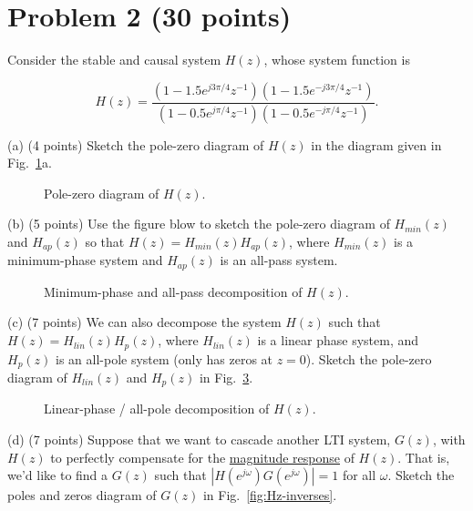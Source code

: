 \documentclass[10pt]{article}
\begin{document}
\section*{Problem 2 (30 points)}
Consider the stable and causal system $H(z)$, whose system function is

\begin{equation}
	H(z) = \frac{(1 - 1.5e^{j3\pi/4}z^{-1})(1 - 1.5e^{-j3\pi/4}z^{-1})}{(1 - 0.5e^{j\pi/4}z^{-1})(1 - 0.5e^{-j\pi/4}z^{-1})}.
\end{equation}

\begin{description}
\item{(a)} (4 points)
Sketch the pole-zero diagram of $H(z)$ in the diagram given in Fig.~\ref{fig:pole-zero-sketch}a.

\begin{figure}[!h]
\centering
	\resizebox{0.45\textwidth}{!}{}
    \caption{Pole-zero diagram of $H(z)$.} \label{fig:pole-zero-sketch}
\end{figure}

\item{(b)} (5 points) Use the figure blow to sketch the pole-zero diagram of $H_{min}(z)$ and $H_{ap}(z)$ so that $H(z) = H_{min}(z)H_{ap}(z)$, where $H_{min}(z)$ is a minimum-phase system and $H_{ap}(z)$ is an all-pass system. 

\begin{figure}[!h]
	\centering
	\resizebox{0.9\textwidth}{!}{}
	\caption{Minimum-phase and all-pass decomposition of $H(z)$.} \label{fig:min-all-pass}
\end{figure}

\item{(c)} (7 points) We can also decompose the system $H(z)$ such that $H(z) = H_{lin}(z)H_p(z)$, where $H_{lin}(z)$ is a linear phase system, and $H_p(z)$ is an all-pole system (only has zeros at $z = 0$). Sketch the pole-zero diagram of $H_{lin}(z)$ and $H_{p}(z)$ in Fig.~\ref{fig:lin-p}.

\begin{figure}[!h]
	\centering
	\resizebox{0.9\textwidth}{!}{}
	\caption{Linear-phase / all-pole decomposition of $H(z)$.} \label{fig:lin-p}
\end{figure}

\item{(d)} (7 points) Suppose that we want to cascade another LTI system, $G(z)$, with $H(z)$ to perfectly compensate for the \underline{magnitude response} of $H(z)$. That is, we'd like to find a $G(z)$ such that $|H(e^{j\omega})G(e^{j\omega})| = 1$ for all $\omega$. Sketch the poles and zeros diagram of $G(z)$ in Fig.~\ref{fig:Hz-inverses}.


\end{description}
\end{document}

